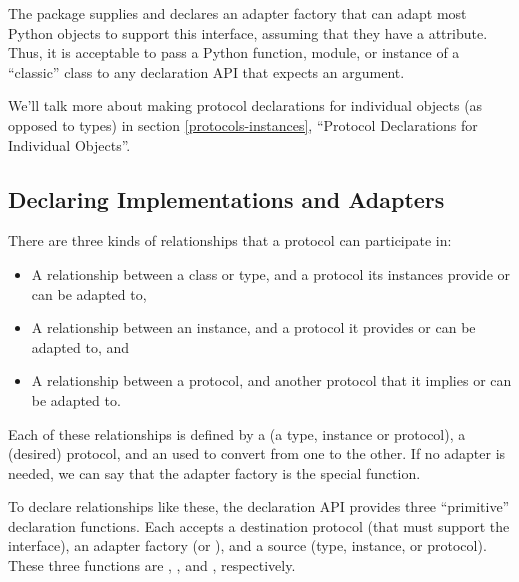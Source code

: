 \begin{verbatim%
}
\begin{verbatim%
}
\begin{verbatim%
}
\begin{verbatim%
}
\begin{verbatim%
}
\begin{verbatim%
}
\begin{description}
The  package supplies and declares an adapter factory that
can adapt most Python objects to support this interface, assuming that they
have a  attribute.  Thus, it is acceptable to pass a Python
function, module, or instance of a  ``classic'' class to any declaration API
that expects an  argument.

We'll talk more about making protocol declarations for individual objects
(as opposed to types) in section \ref{protocols-instances}, ``Protocol
Declarations for Individual Objects''.

\end{description}










\newpage
\subsection{Declaring Implementations and Adapters}
There are three kinds of relationships that a protocol can participate in:

\begin{itemize}
\item A relationship between a class or type, and a protocol its instances
provide or can be adapted to,

\item A relationship between an instance, and a protocol it provides or can
be adapted to, and

\item A relationship between a protocol, and another protocol that it implies
or can be adapted to.
\end{itemize}

Each of these relationships is defined by a  (a type,
instance or protocol), a  (desired) protocol, and an
 used to convert from one to the other.  If no adapter
is needed, we can say that the adapter factory is the special
 function.

To declare relationships like these, the  declaration API
provides three ``primitive'' declaration functions.  Each accepts a destination
protocol (that must support the  interface),
an adapter factory (or ), and a source (type,
instance, or protocol).  These three functions are
, , and
, respectively.


\end{verbatim%
}
\end{verbatim%
}
\end{verbatim%
}
\end{verbatim%
}
\end{verbatim%
}
\end{verbatim%
}
